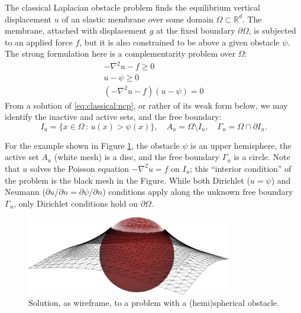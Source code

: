 \documentclass[]{interact}
\theoremstyle{plain}%
\theoremstyle{definition}
\theoremstyle{remark}
\newcommand{\RR}{\mathbb{R}}
\begin{document}
The classical Laplacian obstacle problem \cite{KinderlehrerStampacchia1980} finds the equilibrium vertical displacement $u$ of an elastic membrane over some domain $\Omega \subset \RR^d$.  The membrane, attached with displacement $g$ at the fixed boundary $\partial\Omega$, is subjected to an applied force $f$, but it is also constrained to be above a given obstacle $\psi$.  The strong formulation here is a complementarity problem over $\Omega$:
\begin{subequations} \label{eq:classical:ncp}
\begin{align}
  -\nabla^2 u - f \geq 0 \label{eq:classical:ncp:a} \\
  u - \psi \geq 0\\
  (-\nabla^2u - f)(u - \psi) = 0 \label{eq:classical:ncp:c}
\end{align}
\end{subequations}
From a solution of \eqref{eq:classical:ncp}, or rather of its weak form below, we may identify the inactive and active sets, and the free boundary:
\begin{equation}
  I_u = \{x \in \Omega \,:\, u(x) > \psi(x)\}, \quad A_u = \Omega \setminus I_u, \quad \Gamma_u = \Omega \cap \partial I_u. \label{eq:classical:sets}
\end{equation}

For the example shown in Figure \ref{fig:ball}, the obstacle $\psi$ is an upper hemisphere, the active set $A_u$ (white mesh) is a disc, and the free boundary $\Gamma_u$ is a circle.  Note that $u$ solves the Poisson equation $-\nabla^2u = f$ on $I_u$; this ``interior condition'' of the problem is the black mesh in the Figure.  While both Dirichlet ($u=\psi$) and Neumann ($\partial u/\partial n = \partial \psi/\partial n$) conditions apply along the unknown free boundary $\Gamma_u$, only Dirichlet conditions hold on $\partial\Omega$.

\begin{figure}[H]
\centering
\includegraphics[width=0.8\textwidth]{static/obstacle.png}
\caption{Solution, as wireframe, to a problem with a (hemi)spherical obstacle.}
\label{fig:ball}
\end{figure}
\end{document}
